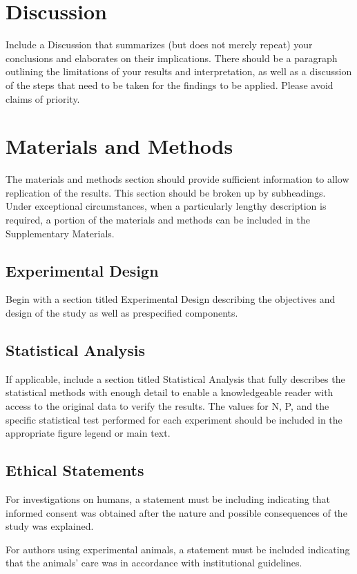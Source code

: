 \documentclass{article}
\begin{document}
\section{Discussion}
Include a Discussion that summarizes (but does not merely repeat) your conclusions and elaborates on their implications. There should be a paragraph outlining the limitations of your results and interpretation, as well as a discussion of the steps that need to be taken for the findings to be applied. Please avoid claims of priority. 

\section{Materials and Methods}
The materials and methods section should provide sufficient information to allow replication of the results. This section should be broken up by subheadings. Under exceptional circumstances, when a particularly lengthy description is required, a portion of the materials and methods can be included in the Supplementary Materials. 

\subsection{Experimental Design}
Begin with a section titled Experimental Design describing the objectives and design of the study as well as prespecified components. 

\subsection{Statistical Analysis}
If applicable, include a section titled Statistical Analysis that fully describes the statistical methods with enough detail to enable a knowledgeable reader with access to the original data to verify the results. The values for N, P, and the specific statistical test performed for each experiment should be included in the appropriate figure legend or main text. 

\subsection{Ethical Statements}
For investigations on humans, a statement must be including indicating that informed consent was obtained after the nature and possible consequences of the study was explained.

For authors using experimental animals, a statement must be included indicating that the animals’ care was in accordance with institutional guidelines.
\end{document}
